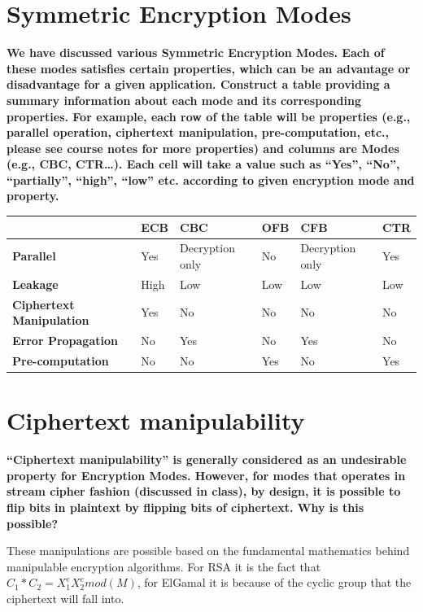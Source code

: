 \documentclass[letterpaper,11pt,notitlepage,fleqn]{article}
\begin{document}
\section{Symmetric Encryption Modes}
\noindent \textbf{We have discussed various Symmetric Encryption Modes. Each of  these modes  satisfies certain properties, which can be  an  advantage or disadvantage  for  a given  application. Construct a  table providing a  summary  information  about  each mode and  its corresponding properties. For example,  each  row  of  the  table  will  be  properties  (e.g.,  parallel  operation,  ciphertext manipulation,  pre-computation,  etc.,  please  see  course  notes  for  more  properties)  and  columns are  Modes  (e.g.,  CBC,  CTR…).  Each  cell  will  take  a  value  such  as  “Yes”,  “No”,  “partially”, “high”, “low” etc. according to given encryption mode and property.}
\begin{center}
\begin{tabular}{|l|l|l|l|l|l|}
    \hline
    & \textbf{ECB} & \textbf{CBC} & \textbf{OFB} & \textbf{CFB} & \textbf{CTR} \\ \hline
    \textbf{Parallel} & Yes & Decryption only & No & Decryption only & Yes \\ \hline
    \textbf{Leakage} & High & Low & Low & Low & Low \\ \hline
    \textbf{Ciphertext Manipulation} & Yes & No & No & No & No \\ \hline
    \textbf{Error Propagation} & No & Yes & No & Yes & No \\ \hline
    \textbf{Pre-computation} & No & No & Yes & No & Yes \\ \hline
\end{tabular}
\end{center}
\section{Ciphertext  manipulability}
\noindent \textbf{“Ciphertext  manipulability”  is  generally  considered  as  an  undesirable  property  for Encryption  Modes.  However,  for  modes  that  operates  in  stream  cipher  fashion  (discussed  in class), by design, it is possible to flip bits in plaintext by flipping bits of ciphertext. Why is this possible?}

These manipulations are possible based on the fundamental mathematics behind manipulable encryption algorithms. For RSA it is the fact that $C_{1} \ast C_{2} = X_{1}^{e}X_{2}^{e}mod(M)$, for ElGamal it is because of the cyclic group that the ciphertext will fall into. 
\end{document}
